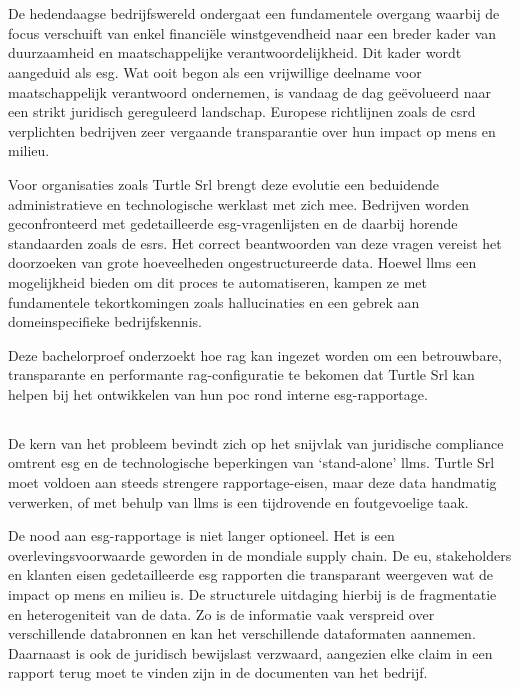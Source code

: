 \chapter{}%
\label{ch:inleiding}

De hedendaagse bedrijfswereld ondergaat een fundamentele overgang waarbij de focus verschuift van enkel financiële winstgevendheid naar een breder kader van duurzaamheid en maatschappelijke verantwoordelijkheid. Dit kader wordt aangeduid als \gls{esg}. Wat ooit begon als een vrijwillige deelname voor maatschappelijk verantwoord ondernemen, is vandaag de dag geëvolueerd naar een strikt juridisch gereguleerd landschap. Europese richtlijnen zoals de \gls{csrd} verplichten bedrijven zeer vergaande transparantie over hun impact op mens en milieu.

Voor organisaties zoals Turtle Srl brengt deze evolutie een beduidende administratieve en technologische werklast met zich mee. Bedrijven worden geconfronteerd met gedetailleerde \gls{esg}-vragenlijsten en de daarbij horende standaarden zoals de \gls{esrs}. Het correct beantwoorden van deze vragen vereist het doorzoeken van grote hoeveelheden ongestructureerde data. Hoewel \glspl{llm} een mogelijkheid bieden om dit proces te automatiseren, kampen ze met fundamentele tekortkomingen zoals hallucinaties en een gebrek aan domeinspecifieke bedrijfskennis.

Deze bachelorproef onderzoekt hoe \gls{rag} kan ingezet worden om een betrouwbare, transparante en performante \gls{rag}-configuratie te bekomen dat Turtle Srl kan helpen bij het ontwikkelen van hun \gls{poc} rond interne \gls{esg}-rapportage.

\section{}%
\label{sec:probleemstelling}

De kern van het probleem bevindt zich op het snijvlak van juridische compliance omtrent \gls{esg} en de technologische beperkingen van ‘stand-alone’ \glspl{llm}. Turtle Srl moet voldoen aan steeds strengere rapportage-eisen, maar deze data handmatig verwerken, of met behulp van \glspl{llm} is een tijdrovende en foutgevoelige taak.

De nood aan \gls{esg}-rapportage is niet langer optioneel. Het is een overlevingsvoorwaarde geworden in de mondiale supply chain. De \gls{eu}, stakeholders en klanten eisen gedetailleerde \gls{esg} rapporten die transparant weergeven wat de impact op mens en milieu is. De structurele uitdaging hierbij is de fragmentatie en heterogeniteit van de data. Zo is de informatie vaak verspreid over verschillende databronnen en kan het verschillende dataformaten aannemen. Daarnaast is ook de juridisch bewijslast verzwaard, aangezien elke claim in een rapport terug moet te vinden zijn in de documenten van het bedrijf.

